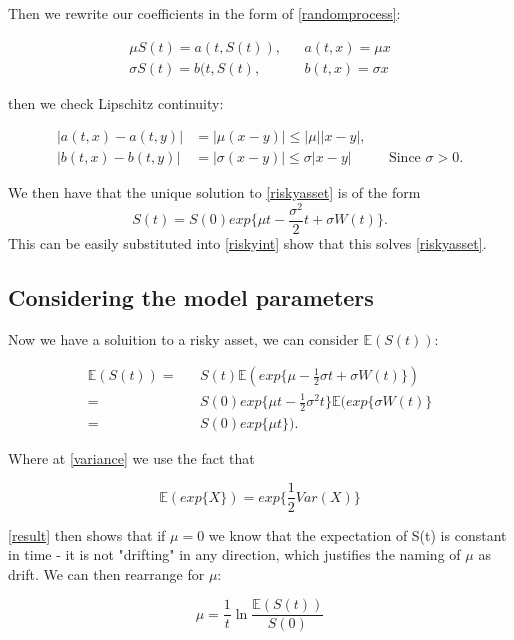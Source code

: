 \documentclass[11pt]{article} %
\begin{document}
Then we rewrite our coefficients in the form of \ref{randomprocess}: 

\begin{align}
    \mu S(t) = a(t,S(t)), && a(t,x) = \mu x \\
    \sigma S(t) = b(t,S(t), && b(t,x) = \sigma x
\end{align}

then we check Lipschitz continuity:

\begin{align}
    |a(t,x) - a(t,y)| &= |\mu(x-y)| \leq |\mu||x-y|, \\
    |b(t,x) - b(t,y)| &= |\sigma(x-y)| \leq \sigma|x-y| &&\text{Since $\sigma > 0$.}
\end{align}

We then have that the unique solution to \ref{riskyasset} is of the form 
\begin{equation}
    S(t) = S(0)exp\{\mu t - \frac{\sigma^2}{2}t + \sigma W(t)\}.
\end{equation}
This can be easily substituted into \ref{riskyint} show that this solves \ref{riskyasset}.

\subsection{Considering the model parameters}

Now we have a soluition to a risky asset, we can consider $\mathbb{E}(S(t))$:

\begin{align}
    \mathbb{E}(S(t))  = &&S(t)\mathbb{E}(exp\{\mu - \frac{1}{2}\sigma t + \sigma W(t)\})\\
     \label{variance}= 
     && S(0)exp\{\mu t - \frac{1}{2}\sigma^2 t\}\mathbb{E}(exp\{\sigma W(t)\} \\
    \label{result} = && S(0)exp\{\mu t\}).
\end{align}

Where at \ref{variance} we use the fact that 

\begin{equation*}
    \mathbb{E}(exp\{X\}) = exp\{\frac{1}{2}Var(X)\}
\end{equation*}

\ref{result} then shows that if $\mu = 0$ we know that the expectation of S(t) is 
constant in time - it is not "drifting" in any direction, which justifies the 
naming of $\mu$ as drift. We can then rearrange for $\mu$:

\begin{equation} \label{mu}
    \mu = \frac{1}{t}\ln{\frac{\mathbb{E}(S(t))}{S(0)}}
\end{equation}
\end{document}
